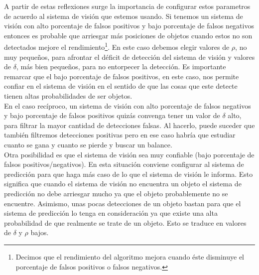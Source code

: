 	\indent A partir de estas reflexiones surge la importancia de configurar 
	estos parametros de acuerdo al sistema de visión que estemos 
	usando. Si tenemos un sistema de visión con alto porcentaje de 
	falsos positivos y bajo porcentaje de falsos negativos entonces es 
	probable que arriesgar más posiciones de objetos cuando estos no 
	son detectados mejore el rendimiento\footnote{ Decimos que el 
	rendimiento del algoritmo mejora cuando éste disminuye el 
	porcentaje de falsos positivos o falsos negativos.}. En este caso debemos elegir 
	valores de $\rho$, no muy pequeños, para afrontar el déficit de 
	detección del sistema de visión y valores de $\delta$, más bien 
	pequeños, para no entorpecer la detección. Es importante remarcar 
	que el bajo porcentaje de falsos positivos, en este caso, nos 
	permite confiar en el sistema de visión en el sentido de que las cosas que 
	este detecte tienen altas probabilidades de ser objetos. \\
	\indent En el caso recíproco, un sistema de visión con alto 
	porcentaje de falsos negativos y bajo porcentaje de falsos 
	positivos quizás convenga tener un valor de $\delta$ alto, para 
	filtrar la mayor cantidad de detecciones falsas. Al hacerlo, puede 
	suceder que también filtremos detecciones positivas pero en ese 
	caso habría que estudiar cuanto se gana y cuanto se pierde y 
	buscar un balance.\\
	\indent Otra posibilidad es que el sistema de visión sea muy 
	confiable (bajo porcentaje de falsos positivos/negativos). En 
	esta situación conviene configurar al sistema de predicción para 
	que haga más caso de lo que el sistema de visión le informa. Esto 
	significa que cuando el sistema de visión no encuentra un objeto 
	el sistema de predicción no debe arriesgar mucho ya que el objeto 
	probablemente no se encuentre. Asimismo, unas pocas detecciones de 
	un objeto bastan para que el sistema de predicción lo tenga 
	en consideración ya que existe una alta probabilidad de que 
	realmente se trate de un objeto. Esto se traduce en valores de 
	$\delta$ y $\rho$ bajos.
 



